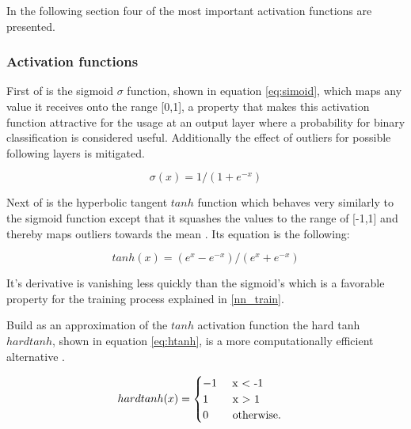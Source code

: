 In the following section four of the most important activation functions are presented.




\subsubsection{Activation functions}
\label{nn_act}

First of is the sigmoid $\sigma$ function, shown in equation \ref{eq:simoid}, which maps any value it receives onto the range [0,1], a property that makes this activation function attractive for the usage at an output layer where a probability for binary classification is considered useful. Additionally the effect of outliers for possible following layers is mitigated.

\begin{equation}
\label{eq:simoid}
    \sigma(x) = 1 / (1 + e^{-x})
\end{equation}


Next of is the hyperbolic tangent $tanh$ function which behaves very similarly to the sigmoid function except that it squashes the values to the range of [-1,1] and thereby maps outliers towards the mean \citep{jurafsky2021}. Its equation is the following:

\begin{equation}
\label{eq:tanh}
    tanh(x) = (e^x - e^{-x}) / (e^x + e^{-x}) 
\end{equation}

It's derivative is vanishing less quickly than the sigmoid's which is a favorable property for the training process explained in \ref{nn_train}.


Build as an approximation of the $tanh$ activation function the hard tanh $hardtanh$, shown in equation \ref{eq:htanh}, is a more computationally efficient alternative \citep{goldberg2017neural}.
    
\begin{equation}
\label{eq:htanh}
    hardtanh(x) = \begin{cases}
  -1   \text{\phantom{xx} x $<$ -1} \\
   1   \text{\phantom{xxxi} x $>$ 1} \\
   0   \text{\phantom{xxxi} otherwise.}
\end{cases}
\end{equation}
    


